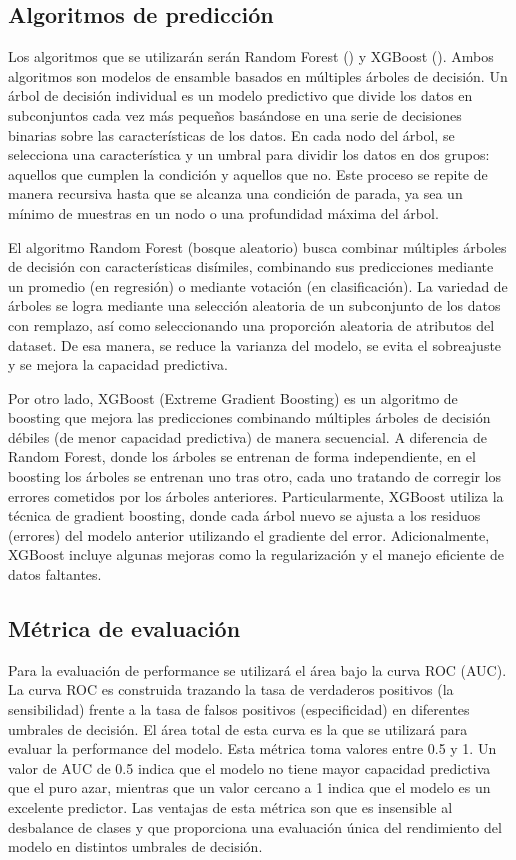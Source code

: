 \documentclass{article}
\begin{document}
\subsection{Algoritmos de predicción}
Los algoritmos que se utilizarán serán Random Forest (\cite{Bre01}) y XGBoost
(\cite{Che16}). Ambos algoritmos son modelos de ensamble basados en múltiples 
árboles de decisión. Un árbol de decisión individual es un modelo predictivo que divide 
los datos en subconjuntos cada vez más pequeños basándose en una serie de decisiones 
binarias sobre las características de los datos. En cada nodo del árbol, se selecciona una 
característica y un umbral para dividir los datos en dos grupos: aquellos que cumplen 
la condición y aquellos que no. Este proceso se repite de manera recursiva hasta que se 
alcanza una condición de parada, ya sea un mínimo de muestras en un nodo o una 
profundidad máxima del árbol.

El algoritmo Random Forest (bosque aleatorio) busca combinar 
múltiples árboles de decisión con características disímiles, combinando sus predicciones
mediante un promedio (en regresión) o mediante votación (en clasificación). 
La variedad de árboles se logra mediante una selección aleatoria de un subconjunto de los 
datos con remplazo, así como seleccionando una proporción aleatoria
de atributos del dataset. De esa manera, se reduce la varianza del modelo, se evita el
sobreajuste y se mejora la capacidad predictiva.

Por otro lado, XGBoost (Extreme Gradient Boosting) es un algoritmo de boosting que mejora 
las predicciones combinando múltiples árboles de decisión débiles (de menor capacidad 
predictiva) de manera secuencial. A diferencia de Random Forest, donde los árboles se 
entrenan de forma independiente, en el boosting los árboles se entrenan uno tras otro, 
cada uno tratando de corregir los errores cometidos por los árboles anteriores. 
Particularmente, XGBoost utiliza la técnica de gradient boosting, donde cada árbol nuevo 
se ajusta a los residuos (errores) del modelo anterior utilizando el gradiente del error. 
Adicionalmente, XGBoost incluye algunas mejoras como la regularización
y el manejo eficiente de datos faltantes. 

\subsection{Métrica de evaluación}
Para la evaluación de performance se utilizará el área bajo la curva ROC 
(AUC). La curva ROC es construida trazando la tasa de verdaderos positivos (la 
sensibilidad) frente a la tasa de falsos positivos (especificidad) en diferentes umbrales 
de decisión. El área total de esta curva es la que se utilizará para evaluar la 
performance del modelo. Esta métrica toma valores entre 0.5 y 1. Un valor de AUC de 0.5 
indica que el modelo no tiene mayor capacidad predictiva que el puro azar, mientras que un 
valor cercano a 1 indica que el modelo es un excelente predictor. Las ventajas de 
esta métrica son que es insensible al desbalance de clases y que proporciona una evaluación
única del rendimiento del modelo en distintos umbrales de decisión.
\end{document}
